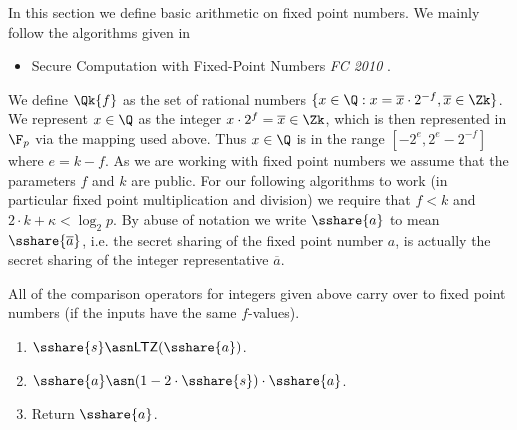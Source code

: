 In this section we define basic arithmetic on fixed
point numbers.
We mainly follow the algorithms given in 
\begin{itemize}
\item Secure Computation with Fixed-Point Numbers {\em FC 2010} \cite{CS10}.
\end{itemize}
We define $\Qk{f}$ as the set of rational numbers
$\{x \in \Q: x = \overline{x} \cdot 2^{-f}, \overline{x} \in \Zk\}$.
We represent $x \in \Q$ as the integer $x \cdot 2^f = \overline{x} \in \Zk$,
which is then represented in $\F_p$ via the mapping used above.
Thus $x \in \Q$ is in the range $[-2^e,2^e-2^{-f}]$
where $e=k-f$.
As we are working with fixed point numbers we assume that the
parameters $f$ and $k$ are public.
For our following algorithms to work (in particular fixed point
multiplication and division) we require that 
$f<k$ and $2 \cdot k + \kappa < \log_2 p$.
By abuse of notation we write $\sshare{a}$ to mean $\sshare{\overline{a}}$,
i.e. the secret sharing of the fixed point number $a$,
is actually the secret sharing of the integer representative
$\overline{a}$.

\iffalse
\msubsubsection{$\mathsf{Scale}(\sshare{a},k,f_1,f_2)$:}
Sometimes we want to scale the input fixed point number $a$
from $\Qk{f_1}$ to $\Qk{f_2}$.
\begin{enumerate}
\item $m \asn f_2-f_1$.
\item If $m\ge 0$ then $\sshare{a'} \asn 2^m \cdot \sshare{a}$.
\item Else $\sshare{a'} \asn \mathsf{TruncPr}(\sshare{a},k,-m)$.
\item Return $\sshare{a'}$.
\end{enumerate}
This is not directly callable from MAMBA it is here purely
for documentation reasons.
\fi

All of the comparison operators for integers given above carry
over to fixed point numbers (if the inputs have the same $f$-values).

\begin{enumerate}
\item $\sshare{s} \asn \mathsf{LTZ}(\sshare{a})$.
\item $\sshare{a} \asn (1-2\cdot \sshare{s}) \cdot \sshare{a}$.
\item Return $\sshare{a}$.
\end{enumerate}

